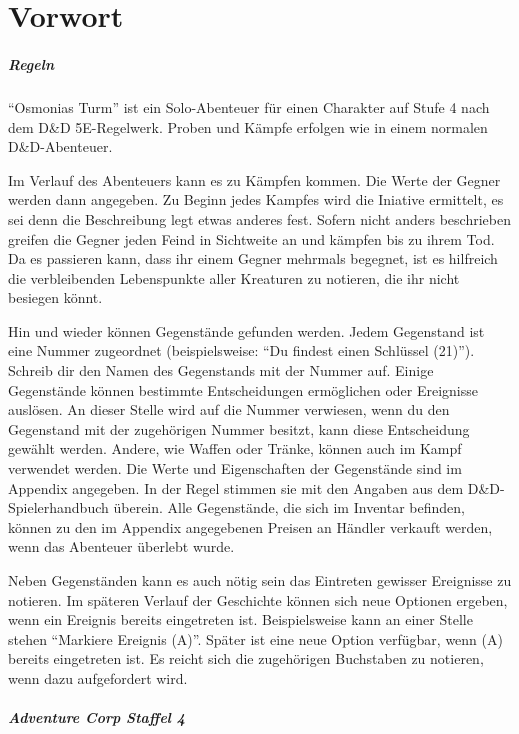 
\chapter{Vorwort}

\paragraph{Regeln}

``Osmonias Turm'' ist ein Solo-Abenteuer für einen Charakter auf Stufe 4 nach dem D\&D 5E-Regelwerk. Proben und Kämpfe erfolgen wie in einem normalen D\&D-Abenteuer.

Im Verlauf des Abenteuers kann es zu Kämpfen kommen. Die Werte der Gegner werden dann angegeben. Zu Beginn jedes Kampfes wird die Iniative ermittelt, es sei denn die Beschreibung legt etwas anderes fest. Sofern nicht anders beschrieben greifen die Gegner jeden Feind in Sichtweite an und kämpfen bis zu ihrem Tod. Da es passieren kann, dass ihr einem Gegner mehrmals begegnet, ist es hilfreich die verbleibenden Lebenspunkte aller Kreaturen zu notieren, die ihr nicht besiegen könnt.

Hin und wieder können Gegenstände gefunden werden. Jedem Gegenstand ist eine Nummer zugeordnet (beispielsweise: ``Du findest einen Schlüssel (21)''). Schreib dir den Namen des Gegenstands mit der Nummer auf. Einige Gegenstände können bestimmte Entscheidungen ermöglichen oder Ereignisse auslösen. An dieser Stelle wird auf die Nummer verwiesen, wenn du den Gegenstand mit der zugehörigen Nummer besitzt, kann diese Entscheidung gewählt werden. Andere, wie Waffen oder Tränke, können auch im Kampf verwendet werden. Die Werte und Eigenschaften der Gegenstände sind im Appendix angegeben. In der Regel stimmen sie mit den Angaben aus dem D\&D-Spielerhandbuch überein. Alle Gegenstände, die sich im Inventar befinden, können zu den im Appendix angegebenen Preisen an Händler verkauft werden, wenn das Abenteuer überlebt wurde.

Neben Gegenständen kann es auch nötig sein das Eintreten gewisser Ereignisse zu notieren. Im späteren Verlauf der Geschichte können sich neue Optionen ergeben, wenn ein Ereignis bereits eingetreten ist. Beispielsweise kann an einer Stelle stehen ``Markiere Ereignis (A)''. Später ist eine neue Option verfügbar, wenn (A) bereits eingetreten ist. Es reicht sich die zugehörigen Buchstaben zu notieren, wenn dazu aufgefordert wird.

\paragraph{Adventure Corp Staffel 4}

